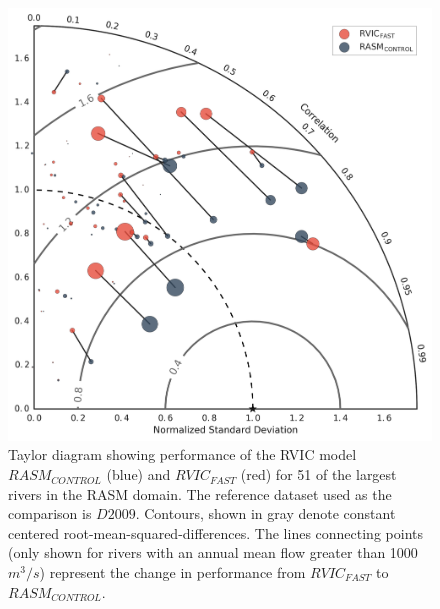\documentclass[jgrga, draft]{agutex}
\begin{document}
\clearpage
\begin{figure}
\noindent\includegraphics[width=40pc,natwidth=1]{R1010RBRbaaa01a_rvicfast_taylordiag}
\caption{Taylor diagram showing performance of the RVIC model $RASM_{CONTROL}$ (blue) and $RVIC_{FAST}$ (red) for 51 of the largest rivers in the RASM domain.
The reference dataset used as the comparison is $D2009$.
Contours, shown in gray denote constant centered root-mean-squared-differences.
The lines connecting points (only shown for rivers with an annual mean flow greater than 1000 $m^3/s$) represent the change in performance from $RVIC_{FAST}$ to $RASM_{CONTROL}$.
}
\label{fig:taylor}
\end{figure}
\end{document}
